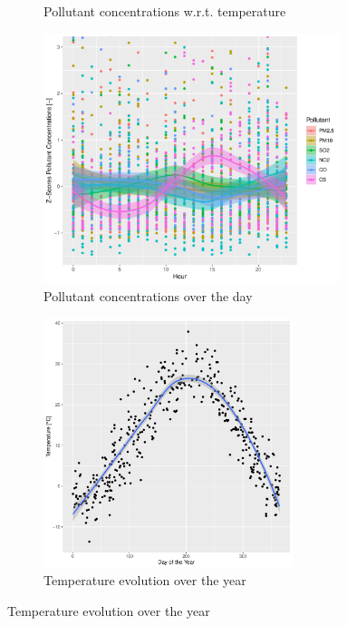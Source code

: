 \documentclass[a4paper, 12pt]{article}
\begin{document}
\begin{figure}[h]
\begin{subfigure}{.49\textwidth}
            \caption{Pollutant concentrations w.r.t. temperature}
            \label{fig:pollutant_temp}
            \vspace{0.5em}
        \end{subfigure}
        \begin{subfigure}{.49\textwidth}
            \centering
            \includegraphics[width=0.95\textwidth]{resources/pdf/pollutants_hour.pdf}
            \caption{Pollutant concentrations over the day}
            \label{fig:pollutant_hour}
        \end{subfigure}
        \begin{subfigure}{.49\textwidth}
            \centering
            \includegraphics[width=0.8\textwidth]{resources/pdf/temp_months.pdf}
            \caption{Temperature evolution over the year}
            \label{fig:temp_months}
        \end{subfigure}
        \label{fig:temp_pollutant_months}
    \end{figure}
\end{document}
